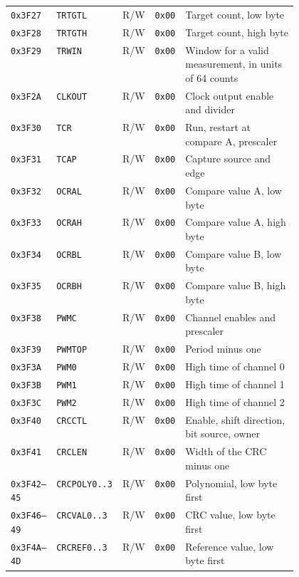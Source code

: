 \begin{longtable}{@{}llllp{0.47\linewidth}@{}}
\texttt{0x3F27} & \texttt{TRTGTL} & R/W & \texttt{0x00} & Target count, low byte \\
\texttt{0x3F28} & \texttt{TRTGTH} & R/W & \texttt{0x00} & Target count, high byte \\
\texttt{0x3F29} & \texttt{TRWIN} & R/W & \texttt{0x00} & Window for a valid measurement, in units of 64 counts \\
\texttt{0x3F2A} & \texttt{CLKOUT} & R/W & \texttt{0x00} & Clock output enable and divider \\
\midrule
\texttt{0x3F30} & \texttt{TCR} & R/W & \texttt{0x00} & Run, restart at compare A, prescaler \\
\texttt{0x3F31} & \texttt{TCAP} & R/W & \texttt{0x00} & Capture source and edge \\
\texttt{0x3F32} & \texttt{OCRAL} & R/W & \texttt{0x00} & Compare value A, low byte \\
\texttt{0x3F33} & \texttt{OCRAH} & R/W & \texttt{0x00} & Compare value A, high byte \\
\texttt{0x3F34} & \texttt{OCRBL} & R/W & \texttt{0x00} & Compare value B, low byte \\
\texttt{0x3F35} & \texttt{OCRBH} & R/W & \texttt{0x00} & Compare value B, high byte \\
\midrule
\texttt{0x3F38} & \texttt{PWMC} & R/W & \texttt{0x00} & Channel enables and prescaler \\
\texttt{0x3F39} & \texttt{PWMTOP} & R/W & \texttt{0x00} & Period minus one \\
\texttt{0x3F3A} & \texttt{PWM0} & R/W & \texttt{0x00} & High time of channel 0 \\
\texttt{0x3F3B} & \texttt{PWM1} & R/W & \texttt{0x00} & High time of channel 1 \\
\texttt{0x3F3C} & \texttt{PWM2} & R/W & \texttt{0x00} & High time of channel 2 \\
\midrule
\texttt{0x3F40} & \texttt{CRCCTL} & R/W & \texttt{0x00} & Enable, shift direction, bit source, owner \\
\texttt{0x3F41} & \texttt{CRCLEN} & R/W & \texttt{0x00} & Width of the CRC minus one \\
\texttt{0x3F42--45} & \texttt{CRCPOLY0..3} & R/W & \texttt{0x00} & Polynomial, low byte first \\
\texttt{0x3F46--49} & \texttt{CRCVAL0..3} & R/W & \texttt{0x00} & CRC value, low byte first \\
\texttt{0x3F4A--4D} & \texttt{CRCREF0..3} & R/W & \texttt{0x00} & Reference value, low byte first \\

\end{longtable}
